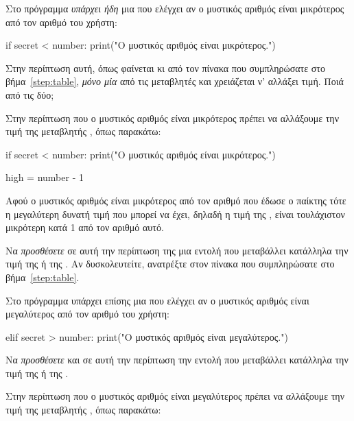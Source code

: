 \documentclass[a4paper,11pt,oneside]{book}
\begin{document}
\begin{step}

Στο πρόγραμμα \emph{υπάρχει ήδη} μια  που ελέγχει αν ο μυστικός αριθμός είναι μικρότερος από τον αριθμό του χρήστη:

\begin{pyplain}
    if secret < number:
        print("Ο μυστικός αριθμός είναι μικρότερος.")
\end{pyplain}

Στην περίπτωση αυτή, όπως φαίνεται κι από τον πίνακα που συμπληρώσατε στο βήμα~\ref{step:table}, \emph{μόνο μία} από τις μεταβλητές  και  χρειάζεται ν' αλλάξει τιμή. Ποιά από τις δύο;

\begin{answer}
Στην περίπτωση που ο μυστικός αριθμός είναι μικρότερος πρέπει να αλλάξουμε την τιμή της μεταβλητής , όπως παρακάτω:

\begin{pyplain}
    if secret < number:
        print("Ο μυστικός αριθμός είναι μικρότερος.")
\end{pyplain}
\begin{pynew}
        high = number - 1
\end{pynew}

Αφού ο μυστικός αριθμός είναι μικρότερος από τον αριθμό που έδωσε ο παίκτης τότε η μεγαλύτερη δυνατή τιμή που μπορεί να έχει, δηλαδή η τιμή της , είναι τουλάχιστον μικρότερη κατά 1 από τον αριθμό αυτό. 
\end{answer}

Να \emph{προσθέσετε} σε αυτή την περίπτωση της  μια εντολή που μεταβάλλει κατάλληλα την τιμή της  ή της . Αν δυσκολευτείτε, ανατρέξτε στον πίνακα που συμπληρώσατε στο βήμα~\ref{step:table}.

Στο πρόγραμμα υπάρχει επίσης μια  που ελέγχει αν ο μυστικός αριθμός είναι μεγαλύτερος από τον αριθμό του χρήστη:

\begin{pyplain}
    elif secret > number:
        print("Ο μυστικός αριθμός είναι μεγαλύτερος.")
\end{pyplain}

Να \emph{προσθέσετε} και σε αυτή την περίπτωση την εντολή που μεταβάλλει κατάλληλα την τιμή της  ή της . 

\begin{answer}
Στην περίπτωση που ο μυστικός αριθμός είναι μεγαλύτερος πρέπει να αλλάξουμε την τιμή της μεταβλητής , όπως παρακάτω:
	

\end{answer}
\end{step}
\end{document}
